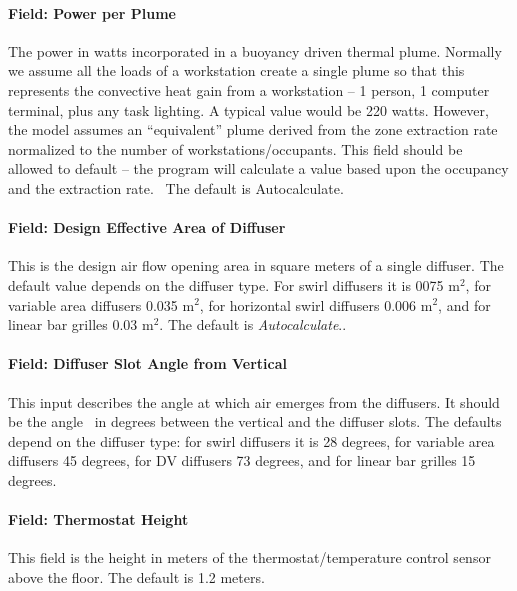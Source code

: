 \paragraph{Field: Power per Plume}\label{field-power-per-plume}

The power in watts incorporated in a buoyancy driven thermal plume. Normally we assume all the loads of a workstation create a single plume so that this represents the convective heat gain from a workstation -- 1 person, 1 computer terminal, plus any task lighting. A typical value would be 220 watts. However, the model assumes an ``equivalent'' plume derived from the zone extraction rate normalized to the number of workstations/occupants. This field should be allowed to default -- the program will calculate a value based upon the occupancy and the extraction rate.~ The default is Autocalculate.

\paragraph{Field: Design Effective Area of Diffuser}\label{field-design-effective-area-of-diffuser}

This is the design air flow opening area in square meters of a single diffuser. The default value depends on the diffuser type. For swirl diffusers it is 0075 m\(^{2}\), for variable area diffusers 0.035 m\(^{2}\), for horizontal swirl diffusers 0.006 m\(^{2}\), and for linear bar grilles 0.03 m\(^{2}\). The default is \emph{Autocalculate}..

\paragraph{Field: Diffuser Slot Angle from Vertical}\label{field-diffuser-slot-angle-from-vertical}

This input describes the angle at which air emerges from the diffusers. It should be the angle~ in degrees between the vertical and the diffuser slots. The defaults depend on the diffuser type: for swirl diffusers it is 28 degrees, for variable area diffusers 45 degrees, for DV diffusers 73 degrees, and for linear bar grilles 15 degrees.

\paragraph{Field: Thermostat Height}\label{field-thermostat-height-2}

This field is the height in meters of the thermostat/temperature control sensor above the floor. The default is 1.2 meters.

